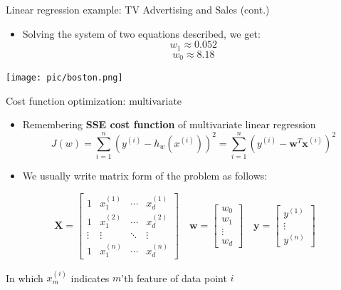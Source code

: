 \documentclass[serif, aspectratio=169]{beamer}
\begin{document}
\begin{frame}{Linear regression example: TV Advertising and Sales (cont.)}
\begin{minipage}{0.4\textwidth}
    \begin{itemize}
        \item Solving the system of two equations described, we get:
        \[ w_1 \approx 0.052 \]
        \[ w_0 \approx 8.18 \]
    \end{itemize}
\end{minipage}%
\begin{minipage}{0.55\textwidth}
\centering
\texttt{[image: pic/boston.png]}
\end{minipage}

\end{frame}

\begin{frame}{Cost function optimization: multivariate}
    \begin{itemize}
        \item Remembering \textbf{SSE cost function} of multivariate linear regression
            \[
            J(w) = \sum_{i=1}^{n} \left( y^{(i)} - h_w(x^{(i)}) \right)^2 = \sum_{i=1}^{n} \left( y^{(i)} - \mathbf{w}^T \mathbf{x}^{(i)} \right)^2
            \]
        \item We usually write matrix form of the problem as follows:
        
    \end{itemize}
    
    \[
    \mathbf{X} =
    \begin{bmatrix}
    1 & x_1^{(1)} & \cdots & x_d^{(1)} \\
    1 & x_1^{(2)} & \cdots & x_d^{(2)} \\
    \vdots & \vdots & \ddots & \vdots \\
    1 & x_1^{(n)} & \cdots & x_d^{(n)}
    \end{bmatrix}
    \quad
    \mathbf{w} =
    \begin{bmatrix}
    w_0 \\
    w_1 \\
    \vdots \\
    w_d
    \end{bmatrix}
    \quad
    \mathbf{y} =
    \begin{bmatrix}
    y^{(1)} \\
    \vdots \\
    y^{(n)}
    \end{bmatrix}
    \]
    
    \begin{center}
    In which \( x_m^{(i)} \) indicates \(m \)'th feature of data point \( i\) \\
    \end{center}

\end{frame}
\end{document}
